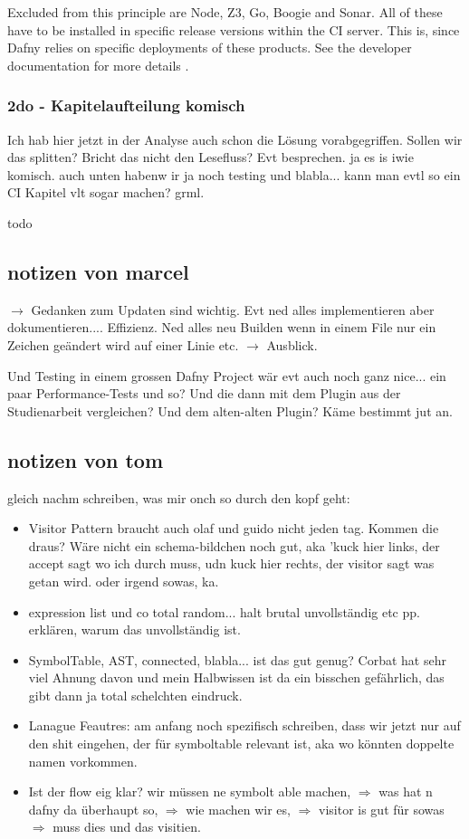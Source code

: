 Excluded from this principle are Node, Z3, Go, Boogie and Sonar.
All of these have to be installed in specific release versions within the CI server.
This is, since Dafny relies on specific deployments of these products. See the developer documentation for more details \cite{dev}. \\

\subsubsection{2do - Kapitelaufteilung komisch}
Ich hab hier jetzt in der Analyse auch schon die Lösung vorabgegriffen. Sollen wir das splitten? Bricht das nicht den Lesefluss? Evt besprechen.
ja es is iwie komisch. auch unten habenw ir ja noch testing und blabla... kann man evtl so ein CI Kapitel vlt sogar machen? grml.

todo


\subsection{notizen von marcel}

$\rightarrow$ Gedanken zum Updaten sind wichtig. Evt ned alles implementieren aber dokumentieren.... Effizienz. Ned alles neu Builden
wenn in einem File nur ein Zeichen geändert wird auf einer Linie etc. $\rightarrow$ Ausblick.

Und Testing in einem grossen Dafny Project wär evt auch noch ganz nice... ein paar Performance-Tests und so?
Und die dann mit dem Plugin aus der Studienarbeit vergleichen? Und dem alten-alten Plugin? Käme bestimmt jut an.


\subsection{notizen von tom}
gleich nachm schreiben, was mir onch so durch den kopf geht:
\begin{itemize}
    \item Visitor Pattern braucht auch olaf und guido nicht jeden tag. Kommen die draus? Wäre nicht ein schema-bildchen noch gut, aka 'kuck hier links, der accept sagt wo ich durch muss, udn kuck hier rechts, der visitor sagt was getan wird. oder irgend sowas, ka.
    \item expression list und co total random... halt brutal unvollständig etc pp. erklären, warum das unvollständig ist.
    \item SymbolTable, AST, connected, blabla... ist das gut genug? Corbat hat sehr viel Ahnung davon und mein Halbwissen ist da ein bisschen gefährlich, das gibt dann ja total schelchten eindruck.
    \item Lanague Feautres: am anfang noch spezifisch schreiben, dass wir jetzt nur auf den shit eingehen, der für symboltable relevant ist, aka wo könnten doppelte namen vorkommen.
    \item Ist der flow eig klar? wir müssen ne symbolt able machen, $\Rightarrow$ was hat n dafny da überhaupt so, $\Rightarrow$ wie machen wir es, $\Rightarrow$ visitor is gut für sowas $\Rightarrow$ muss dies und das visitien.
\end{itemize}
